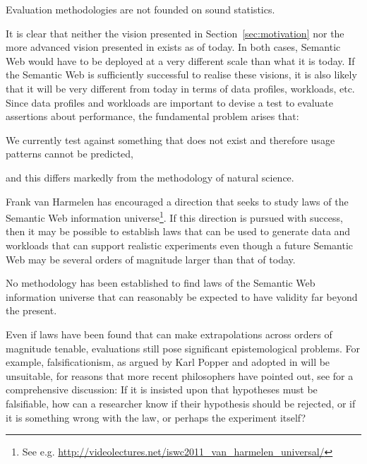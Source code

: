 \begin{problem}\label{prob:badstats}
Evaluation methodologies are not founded on sound statistics.
\end{problem}

It is clear that neither the vision presented in
Section~\ref{sec:motivation} nor the more advanced vision presented in
\cite{berners2001semantic} exists as of today. In both cases, Semantic
Web would have to be deployed at a very different scale than what it
is today. If the Semantic Web is sufficiently successful to realise
these visions, it is also likely that it will be very different from
today in terms of data profiles, workloads, etc. Since data profiles
and workloads are important to devise a test to evaluate assertions
about performance, the fundamental problem arises that: 
\begin{problem}\label{prob:testingnonexist}
We currently test against something that does not exist and therefore
usage patterns cannot be predicted,
\end{problem}
and this differs markedly from the methodology of natural science.

Frank van Harmelen has encouraged a direction that seeks to study laws
of the Semantic Web information universe\footnote{See
  e.g. \url{http://videolectures.net/iswc2011_van_harmelen_universal/}}.
If this direction is pursued with success, then it may be possible to
establish laws that can be used to generate data and workloads that
can support realistic experiments even though a future Semantic Web
may be several orders of magnitude larger than that of today.


\begin{problem}\label{prob:lawsfuture}
No methodology has been established to find laws of the Semantic Web
information universe that can reasonably be expected to have validity
far beyond the present.
\end{problem}

Even if laws have been found that can make extrapolations across
orders of magnitude tenable, evaluations still pose significant
epistemological problems. For example, falsificationism, as argued by
Karl Popper and adopted in \cite{avinatguide} will be unsuitable, for
reasons that more recent philosophers have pointed out, see
\cite{chalmers1999whatis} for a comprehensive discussion: If it is
insisted upon that hypotheses must be falsifiable, how can a researcher
know if their hypothesis should be rejected, or if it is something
wrong with the law, or perhaps the experiment itself?


